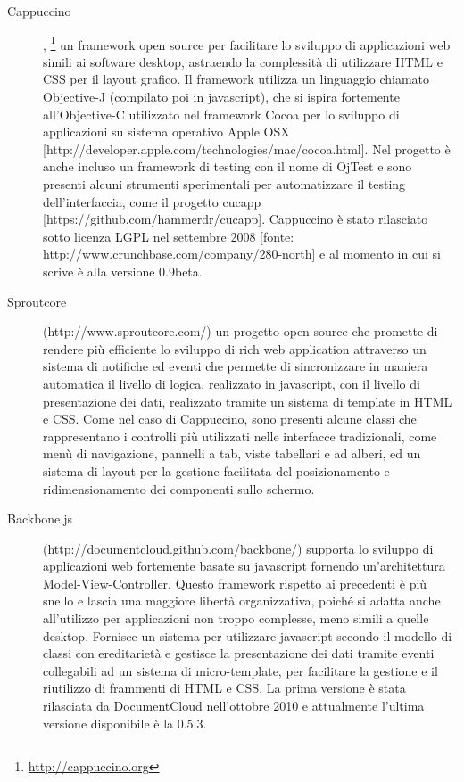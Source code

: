 \begin{description}
\item[Cappuccino],  \footnote{\url{http://cappuccino.org}} un framework open source per facilitare lo sviluppo di applicazioni web simili ai software desktop, astraendo la complessità di utilizzare HTML e CSS per il layout grafico. Il framework utilizza un linguaggio chiamato Objective-J (compilato poi in javascript), che si ispira fortemente all'Objective-C utilizzato nel framework Cocoa per lo sviluppo di applicazioni su sistema operativo Apple OSX [http://developer.apple.com/technologies/mac/cocoa.html]. Nel progetto è anche incluso un framework di testing con il nome di OjTest e sono presenti alcuni strumenti sperimentali per automatizzare il testing dell'interfaccia, come il progetto cucapp [https://github.com/hammerdr/cucapp]. Cappuccino è stato rilasciato sotto licenza LGPL nel settembre 2008 [fonte: http://www.crunchbase.com/company/280-north] e al momento in cui si scrive è alla versione 0.9beta.

\item[Sproutcore] (http://www.sproutcore.com/) un progetto open source che promette di rendere più efficiente lo sviluppo di rich web application attraverso un sistema di notifiche ed eventi che permette di sincronizzare in maniera automatica il livello di logica, realizzato in javascript, con il livello di presentazione dei dati, realizzato tramite un sistema di template in HTML e CSS. Come nel caso di Cappuccino, sono presenti alcune classi che rappresentano i controlli più utilizzati nelle interfacce tradizionali, come menù di navigazione, pannelli a tab, viste tabellari e ad alberi, ed un sistema di layout per la gestione facilitata del posizionamento e ridimensionamento dei componenti sullo schermo.

\item[Backbone.js] (http://documentcloud.github.com/backbone/) supporta lo sviluppo di applicazioni web fortemente basate su javascript fornendo un'architettura Model-View-Controller. Questo framework rispetto ai precedenti è più snello e lascia una maggiore libertà organizzativa, poiché si adatta anche all'utilizzo per applicazioni non troppo complesse, meno simili a quelle desktop. Fornisce un sistema per utilizzare javascript secondo il modello di classi con ereditarietà e gestisce la presentazione dei dati tramite eventi collegabili ad un sistema di micro-template, per facilitare la gestione e il riutilizzo di frammenti di HTML e CSS. La prima versione è stata rilasciata da DocumentCloud nell'ottobre 2010 e attualmente l'ultima versione disponibile è la 0.5.3.

\end{description} 

